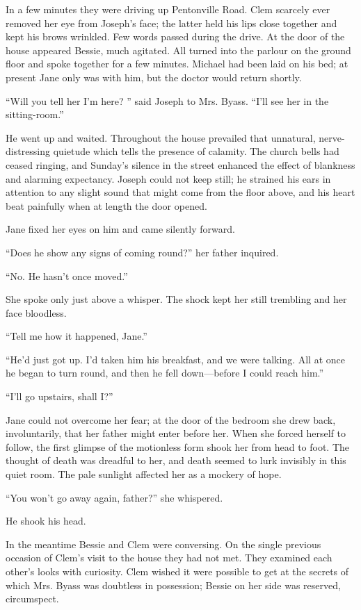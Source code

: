 In a few minutes they were driving up Pentonville Road. Clem scarcely
ever removed her eye from Joseph's face; the latter held his lips close
together and kept his brows wrinkled. Few words passed during the drive.
At the door of the house appeared Bessie, much agitated. All turned into
the parlour on the ground floor and spoke together for a few minutes.
Michael had been laid on his bed; at present Jane only was with him, but
the doctor would return shortly.

``Will you tell her I'm here? '' said Joseph to Mrs. Byass. ``I'll see
her in the sitting-room.''

He went up and waited. Throughout the house prevailed that unnatural,
nerve-distressing quietude which tells the presence of
{\protect\hypertarget{162}{}{}}calamity. The church bells had ceased
ringing, and Sunday's silence in the street enhanced the effect of
blankness and alarming expectancy. Joseph could not keep still; he
strained his ears in attention to any slight sound that might come from
the floor above, and his heart beat painfully when at length the door
opened.

Jane fixed her eyes on him and came silently forward.

``Does he show any signs of coming round?'' her father inquired.

``No. He hasn't once moved.''

She spoke only just above a whisper. The shock kept her still trembling
and her face bloodless.

``Tell me how it happened, Jane.''

``He'd just got up. I'd taken him his breakfast, and we were talking.
All at once he began to turn round, and then he fell down---before I
could reach him.''

``I'll go upstairs, shall I?''

Jane could not overcome her fear; at the door of the bedroom she drew
back, involuntarily, that her father might enter before her. When she
forced herself to follow, the first
{\protect\hypertarget{163}{}{}}glimpse of the motionless form shook her
from head to foot. The thought of death was dreadful to her, and death
seemed to lurk invisibly in this quiet room. The pale sunlight affected
her as a mockery of hope.

``You won't go away again, father?'' she whispered.

He shook his head.

In the meantime Bessie and Clem were conversing. On the single previous
occasion of Clem's visit to the house they had not met. They examined
each other's looks with curiosity. Clem wished it were possible to get
at the secrets of which Mrs. Byass was doubtless in possession; Bessie
on her side was reserved, circumspect.

